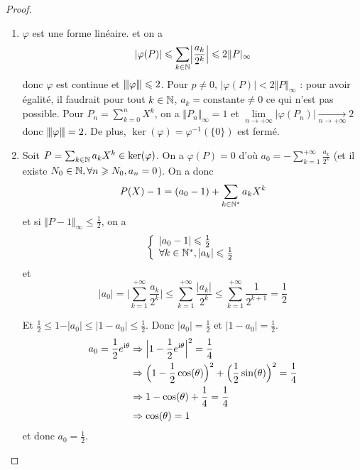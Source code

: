 \begin{proof}
	\phantom{}
	\begin{enumerate}
		\item $\varphi$ est une forme linéaire. et on a 
		\begin{equation}\vert\varphi(P)\vert\leqslant\sum_{k\in\mathbb{N}}\Bigl\vert\frac{a_k}{2^{k}}\Bigr\vert\leqslant2\Vert P\vert_{\infty}\end{equation}
		donc $\varphi$ est continue et ${\left\vert\kern-0.25ex\left\vert\kern-0.25ex\left\vert{}\varphi \right\vert\kern-0.25ex\right\vert\kern-0.25ex\right\vert}\leqslant2$. Pour $p\neq0$, $\vert\varphi(P)\vert<2\Vert P\Vert_{\infty}$ : pour avoir égalité, il faudrait pour tout $k\in\mathbb{N}$, $a_{k}=\text{constante}\neq0$ ce qui n'est pas possible. Pour $P_{n}=\sum_{k=0}^{n}X^{k}$, on a $\Vert P_{n}\Vert_{\infty}=1$ et $\lim\limits_{n\to+\infty}\vert\varphi(P_{n})\vert\xrightarrow[n\to+\infty]{}2$ donc ${\left\vert\kern-0.25ex\left\vert\kern-0.25ex\left\vert{}\varphi \right\vert\kern-0.25ex\right\vert\kern-0.25ex\right\vert}=2$. De plus, $\ker(\varphi)=\varphi^{-1}(\{0\})$ est fermé.

		\item Soit $P=\sum_{k\in\mathbb{N}}a_{k}X^{k}\in\ker(\varphi)$. On a $\varphi(P)=0$ d'où $a_{0}=-\sum_{k=1}^{+\infty}\frac{a_{k}}{2^{k}}$ (et il existe $N_{0}\in\mathbb{N},\forall n\geqslant N_{0},a_{n}=0$). On a donc 
		\begin{equation}P(X)-1=(a_{0}-1)+\sum_{k\in\mathbb{N}^{*}}a_{k}X^{k}\end{equation}
		et si $\Vert P-1\Vert_{\infty}\leqslant\frac{1}{2}$, on a 
		\begin{equation}
		\left\{
			\begin{array}[]{l}
				\vert a_{0}-1\vert\leqslant\frac{1}{2}\\
				\forall k\in\N^{*},\vert a_{k}\vert\leqslant\frac{1}{2}
			\end{array}
		\right.
		\end{equation}
		et 
		\begin{equation}\vert a_{0}\vert=\Biggl\vert\sum_{k=1}^{+\infty}\frac{a_{k}}{2^{k}}\Biggr\vert\leqslant\sum_{k=1}^{+\infty}\frac{\vert a_{k}\vert}{2^{k}}\leqslant\sum_{k=1}^{+\infty}\frac{1}{2^{k+1}}=\frac{1}{2}\end{equation}

		Et $\frac{1}{2}\leqslant 1-\vert a_{0}\vert\leqslant\vert 1-a_{0}\vert\leqslant\frac{1}{2}$. Donc $\vert a_{0}\vert=\frac{1}{2}$ et $\vert 1-a_{0}\vert=\frac{1}{2}$.
		\begin{align}
			a_{0}=\frac{1}{2}e^{\mathrm{i}\theta}
			&\Rightarrow \Bigl\vert 1-\frac{1}{2}e^{\mathrm{i}\theta}\Bigr\vert^{2}=\frac{1}{4}\\
			&\Rightarrow \Bigl(1-\frac{1}{2}\cos(\theta)\Bigr)^{2}+\Bigl(\frac{1}{2}\sin(\theta)\Bigr)^{2}=\frac{1}{4}\\
			&\Rightarrow 1-\cos(\theta)+\frac{1}{4}=\frac{1}{4}\\
			&\Rightarrow \cos(\theta)=1
		\end{align}
		et donc $a_{0}=\frac{1}{2}$.


\end{enumerate}
\end{proof}
